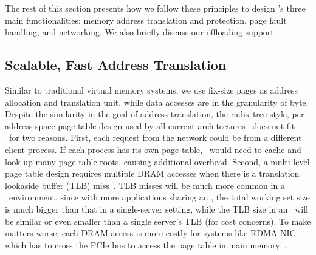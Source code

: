 The rest of this section presents how we follow these principles to design \sys's three main functionalities: memory address translation and protection, page fault handling, and networking. We also briefly discuss our offloading support.

\subsection{Scalable, Fast Address Translation}
\label{sec:addr-trans}
Similar to traditional virtual memory systems, we use fix-size pages as address allocation and translation unit, while data accesses are in the granularity of byte.
Despite the similarity in the goal of address translation,
the radix-tree-style, per-address space page table design used by all current architectures~\cite{ecuckoo-asplos20} does not fit \md\ for two reasons.
First, each request from the network could be from a different client process. If each process has its own page table, \MN\ would need to cache and look up many page table roots, causing additional overhead.
Second, a multi-level page table design requires multiple DRAM accesses when there is a translation lookaside buffer (TLB) miss~\cite{hashpgtable-sigmetrics16}.
TLB misses will be much more common in a \md\ environment, since with more applications sharing an \MN, the total working set size is much bigger than that in a single-server setting, while the TLB size in an \MN\ will be similar or even smaller than a single server's TLB (for cost concerns). To make matters worse, each DRAM access is more costly for systems like RDMA NIC which has to cross the PCIe bus to access the page table in main memory~\cite{Pythia,pcie-sigcomm}.

